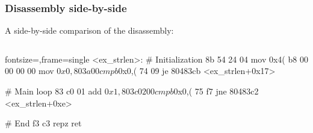 \documentclass[11pt,xcolor=dvipsnames]{beamer}
\begin{document}
\begin{frame}[fragile,t]
\frametitle{Disassembly side-by-side}
A side-by-side comparison of the disassembly:\vspace{-0.8em}
\begin{columns}[T]
\begin{customobjdumpcode*}{fontsize=\fontsize{6.5}{8},frame=single}
<ex_strlen>:
# Initialization
8b 54 24 04     mov    0x4(%
b8 00 00 00 00  mov    $0x0,%
80 3a 00        cmpb   $0x0,(%
74 09           je     80483cb <ex_strlen+0x17>


# Main loop
83 c0 01        add    $0x1,%
80 3c 02 00     cmpb   $0x0,(%
75 f7           jne    80483c2 <ex_strlen+0xe>

# End
f3 c3           repz ret
\end{customobjdumpcode*}
\end{columns}
\end{frame}
\end{document}
